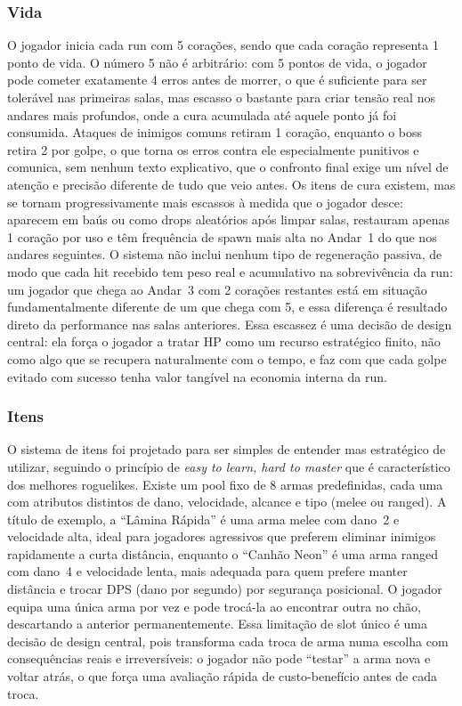 \documentclass[12pt, a4paper]{article}
\begin{document}
\subsubsection{Vida}

O jogador inicia cada run com 5 cora\c{c}\~oes, sendo que cada cora\c{c}\~ao representa 1 ponto de vida. O n\'umero 5 n\~ao \'e arbitr\'ario: com 5 pontos de vida, o jogador pode cometer exatamente 4 erros antes de morrer, o que \'e suficiente para ser toler\'avel nas primeiras salas, mas escasso o bastante para criar tens\~ao real nos andares mais profundos, onde a cura acumulada at\'e aquele ponto j\'a foi consumida. Ataques de inimigos comuns retiram 1 cora\c{c}\~ao, enquanto o boss retira 2 por golpe, o que torna os erros contra ele especialmente punitivos e comunica, sem nenhum texto explicativo, que o confronto final exige um n\'ivel de aten\c{c}\~ao e precis\~ao diferente de tudo que veio antes. Os itens de cura existem, mas se tornam progressivamente mais escassos \`a medida que o jogador desce: aparecem em ba\'us ou como drops aleat\'orios ap\'os limpar salas, restauram apenas 1 cora\c{c}\~ao por uso e t\^em frequ\^encia de spawn mais alta no Andar~1 do que nos andares seguintes. O sistema n\~ao inclui nenhum tipo de regenera\c{c}\~ao passiva, de modo que cada hit recebido tem peso real e acumulativo na sobreviv\^encia da run: um jogador que chega ao Andar~3 com 2 cora\c{c}\~oes restantes est\'a em situa\c{c}\~ao fundamentalmente diferente de um que chega com 5, e essa diferen\c{c}a \'e resultado direto da performance nas salas anteriores. Essa escassez \'e uma decis\~ao de design central: ela for\c{c}a o jogador a tratar HP como um recurso estrat\'egico finito, n\~ao como algo que se recupera naturalmente com o tempo, e faz com que cada golpe evitado com sucesso tenha valor tang\'ivel na economia interna da run.

\subsubsection{Itens}

O sistema de itens foi projetado para ser simples de entender mas estrat\'egico de utilizar, seguindo o princ\'ipio de \textit{easy to learn, hard to master} que \'e caracter\'istico dos melhores roguelikes. Existe um pool fixo de 8 armas predefinidas, cada uma com atributos distintos de dano, velocidade, alcance e tipo (melee ou ranged). A t\'itulo de exemplo, a ``L\^amina R\'apida'' \'e uma arma melee com dano~2 e velocidade alta, ideal para jogadores agressivos que preferem eliminar inimigos rapidamente a curta dist\^ancia, enquanto o ``Canh\~ao Neon'' \'e uma arma ranged com dano~4 e velocidade lenta, mais adequada para quem prefere manter dist\^ancia e trocar DPS (dano por segundo) por seguran\c{c}a posicional. O jogador equipa uma \'unica arma por vez e pode troc\'a-la ao encontrar outra no ch\~ao, descartando a anterior permanentemente. Essa limita\c{c}\~ao de slot \'unico \'e uma decis\~ao de design central, pois transforma cada troca de arma numa escolha com consequ\^encias reais e irrevers\'iveis: o jogador n\~ao pode ``testar'' a arma nova e voltar atr\'as, o que for\c{c}a uma avalia\c{c}\~ao r\'apida de custo-benef\'icio antes de cada troca.
\end{document}
